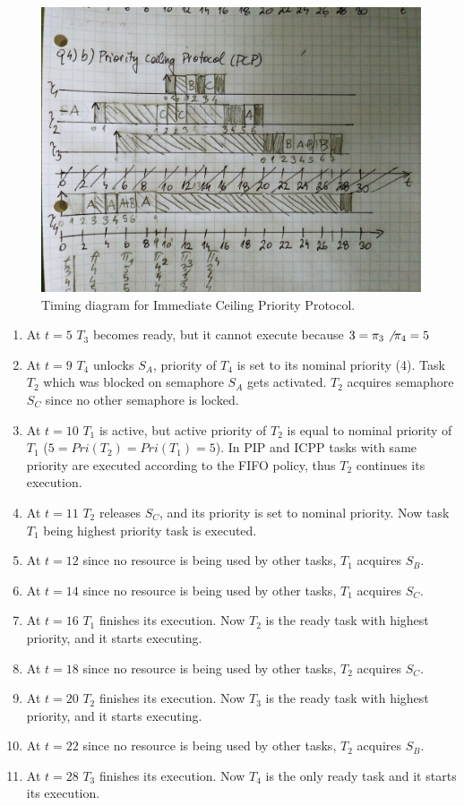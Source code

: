 \documentclass[10pt,a4paper]{article}
\begin{document}
  \begin{figure}[h]
\includegraphics[width=\linewidth]{4b.pdf}
\caption{Timing diagram for Immediate Ceiling Priority Protocol.}
\label{fig:4b}
\end{figure}
\newpage

 \begin{enumerate}
     \item At $t=5$ $T_3$ becomes ready, but it cannot execute because $3=\pi_3\not\>\pi_4=5$
     \item At $t=9$ $T_4$ unlocks $S_A$, priority of $T_4$ is set to its nominal priority (4).
     Task $T_2$ which was blocked on semaphore $S_A$ gets activated.
     $T_2$ acquires semaphore $S_C$ since no other semaphore is locked.
     \item At $t=10$ $T_1$ is active, but active priority of $T_2$ is equal to nominal priority of $T_1$ ($5 = Pri(T_2) = Pri(T_1) = 5$). In PIP and ICPP tasks with same priority are executed according to the FIFO policy, thus $T_2$ continues its execution.
     \item At $t=11$ $T_2$ releases $S_C$, and its priority is set to nominal priority. Now task $T_1$ being highest priority task is executed. 
     \item At $t=12$ since no resource is being used by other tasks, $T_1$ acquires $S_B$.
     \item At $t=14$ since no resource is being used by other tasks, $T_1$ acquires $S_C$.
     \item At $t=16$ $T_1$ finishes its execution. Now $T_2$ is the ready task with highest priority, and it starts executing.
     \item At $t=18$ since no resource is being used by other tasks, $T_2$ acquires $S_C$.
     \item At $t=20$ $T_2$ finishes its execution. Now $T_3$ is the ready task with highest priority, and it starts executing.
     \item At $t=22$ since no resource is being used by other tasks, $T_2$ acquires $S_B$.
     \item At $t=28$ $T_3$ finishes its execution. Now $T_4$ is the only ready task and it starts its execution.
     
 \end{enumerate}
 


\end{document}
